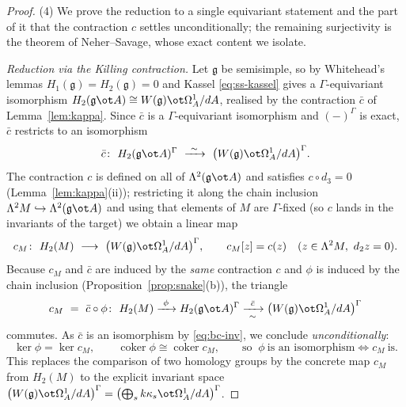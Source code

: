 \documentclass{amsart}
\theoremstyle{definition}
\newcommand{\g}{\mathfrak{g}}
\newcommand{\Om}{\Omega}
\newcommand{\Gm}{\Gamma}
\begin{document}
\begin{proof}
\smallskip
(4) We prove the reduction to a single equivariant statement and the part of it
that the contraction $c$ settles unconditionally; the remaining surjectivity is the
theorem of Neher--Savage, whose exact content we isolate.

\emph{Reduction via the Killing contraction.}  Let $\g$ be semisimple, so by
Whitehead's lemmas $H_1(\g)=H_2(\g)=0$ and Kassel \eqref{eq:ss-kassel} gives a
$\Gm$-equivariant isomorphism $H_2(\g\ot A)\cong W(\g)\ot\Om^1_A/dA$, realised by the
contraction $\bar c$ of Lemma~\ref{lem:kappa}.  Since $\bar c$ is a $\Gm$-equivariant
isomorphism and $(-)^{\Gm}$ is exact, $\bar c$ restricts to an isomorphism
\begin{equation}\label{eq:bc-inv}
   \bar c\colon\ H_2(\g\ot A)^{\Gm}\ \xrightarrow{\ \sim\ }\
   \bigl(W(\g)\ot\Om^1_A/dA\bigr)^{\Gm}.
\end{equation}
The contraction $c$ is defined on all of $\Lambda^2(\g\ot A)$ and satisfies
$c\circ d_3=0$ (Lemma~\ref{lem:kappa}(ii)); restricting it along the chain inclusion
$\Lambda^2M\hookrightarrow\Lambda^2(\g\ot A)$ and using that elements of $M$ are
$\Gm$-fixed (so $c$ lands in the invariants of the target) we obtain a linear map
\[
   c_M\colon\ H_2(M)\ \longrightarrow\ \bigl(W(\g)\ot\Om^1_A/dA\bigr)^{\Gm},\qquad
   c_M[z]=c(z)\quad(z\in\Lambda^2M,\ d_2z=0).
\]
Because $c_M$ and $\bar c$ are induced by the \emph{same} contraction $c$ and $\phi$
is induced by the chain inclusion (Proposition~\ref{prop:snake}(b)), the triangle
\begin{equation}\label{eq:triangle}
   c_M\ =\ \bar c\circ\phi\colon\ H_2(M)\xrightarrow{\ \phi\ }H_2(\g\ot A)^{\Gm}
   \xrightarrow[\ \sim\ ]{\bar c}\bigl(W(\g)\ot\Om^1_A/dA\bigr)^{\Gm}
\end{equation}
commutes.  As $\bar c$ is an isomorphism by \eqref{eq:bc-inv}, we conclude
\emph{unconditionally}:
\begin{equation}\label{eq:phi-cM}
   \ker\phi=\ker c_M,\qquad \operatorname{coker}\phi\cong\operatorname{coker}c_M,
   \qquad\text{so }\ \phi\ \text{is an isomorphism}\iff c_M\ \text{is.}
\end{equation}
This replaces the comparison of two homology groups by the concrete map $c_M$ from
$H_2(M)$ to the explicit invariant space $\bigl(W(\g)\ot\Om^1_A/dA\bigr)^{\Gm}=
\bigl(\bigoplus_s k\kappa_s\ot\Om^1_A/dA\bigr)^{\Gm}$.


\end{proof}
\end{document}
